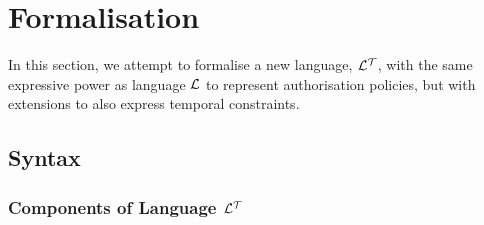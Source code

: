 \documentclass[11pt]{report}
\begin{document}
    \section{Formalisation}

      In this section, we attempt to formalise a new language, ${\cal L^T}$,
      with the same expressive power as language ${\cal L}$ to represent
      authorisation policies, but with extensions to also express temporal
      constraints.

      \subsection{Syntax}

        \subsubsection{Components of Language ${\cal L^T}$}
\end{document}
